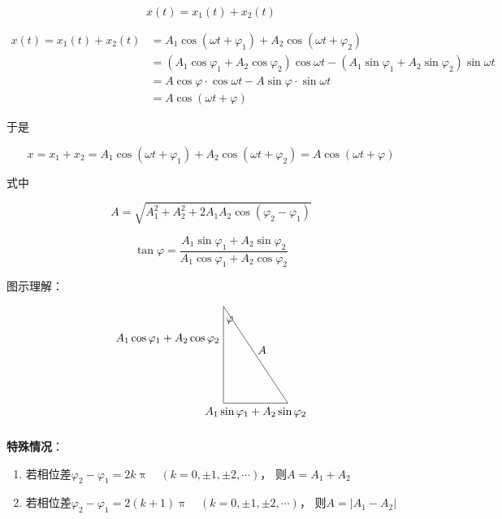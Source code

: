 \documentclass[
	12pt, %
	a4paper, %
]{myLegrandOrangeBook}
\begin{document}
    \[
        x\left(t\right) = x_1\left(t\right) + x_2\left(t\right)
    \]

    $$
        \begin{aligned}
            x(t)=x_1(t)+x_2(t)& =A_1 \cos \left(\omega t+\varphi_1\right)+A_2 \cos \left(\omega t+\varphi_2\right) \\
            & =\left(A_1 \cos \varphi_1+A_2 \cos \varphi_2\right) \cos \omega t-\left(A_1 \sin \varphi_1+A_2 \sin \varphi_2\right) \sin \omega t \\
            & =A \cos \varphi \cdot \cos \omega t-A \sin \varphi \cdot \sin \omega t \\
            & =A \cos (\omega t+\varphi)
        \end{aligned}
    $$

    于是

    \begin{equation}
        x=x_1+x_2=A_1 \cos \left(\omega t+\varphi_1\right)+A_2 \cos \left(\omega t+\varphi_2\right)=A \cos (\omega t+\varphi)
    \end{equation}

    式中

    \begin{equation}
        A=\sqrt{A_1^2+A_2^2+2 A_1 A_2 \cos \left(\varphi_2-\varphi_1\right)}
    \end{equation}

    \begin{equation}
        \tan \varphi=\frac{A_1 \sin \varphi_1+A_2 \sin \varphi_2}{A_1 \cos \varphi_1+A_2 \cos \varphi_2}
    \end{equation}

    图示理解：

    \[
        \begin{tikzpicture}
            \draw (0,0) -- (0,3) -- (2,0) -- cycle;
            \coordinate[label=left:$A_1 \cos \varphi_1+A_2 \cos \varphi_2$] (formulate1)
                at (0,2);
            \coordinate[label=below:$A_1 \sin \varphi_1+A_2 \sin \varphi_2$] (formulate2)
                at (1,0);
            \coordinate[label=below:$\varphi$] (phi) at (0.2,2.8);
            \coordinate[label=above:$A$] (A) at (1.2,1.4);
        \end{tikzpicture}
    \]

    \textbf{特殊情况}：

    \begin{enumerate}
        \item 若相位差$\varphi_2-\varphi_1=2 k \uppi \quad(k=0, \pm 1, \pm 2, \cdots)$，
            则\(A = A_1 + A_2\)
        \item 若相位差$\varphi_2-\varphi_1=2 (k+1) \uppi \quad(k=0, \pm 1, \pm 2, \cdots)$，
            则\(A = \left|A_1 - A_2\right|\)
    \end{enumerate}
\end{document}
